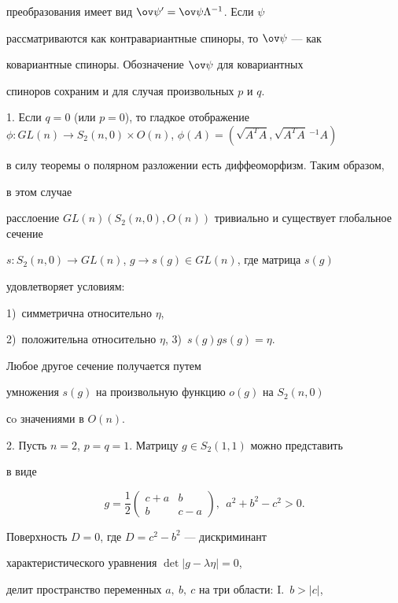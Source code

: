 преобразования имеет вид $\ov \psi'=\ov \psi\Lambda^{-1}$. Если $\psi$ 


рассматриваются как контравариантные спиноры, то $\ov \psi$ --- как 


ковариантные спиноры. Обозначение $\ov \psi$ для ковариантных


спиноров сохраним и для случая произвольных $p$ и $q$.


\smallskip





1. Если $q=0$ (или $p=0$), то гладкое отображение $\phi: GL(n)\to 


S_2(n,0)\times O(n)$, $\phi(A)=(\sqrt{A^TA},\sqrt{A^TA}\,^{-1}A)$


в силу теоремы о полярном разложении есть диффеоморфизм. Таким образом,


в этом случае


расслоение $GL(n)(S_2(n,0),O(n))$ тривиально и существует глобальное сечение


$s: S_2(n,0) \to GL(n)$, $g \to  s(g)\in GL(n)$, где матрица $s(g)$


удовлетворяет условиям:


1)~симметрична относительно $\eta$,


2)~положительна относительно $\eta$, 3)~$s(g)gs(g)=\eta$.


Любое другое сечение получается путем


умножения $s(g)$ на произвольную функцию $o(g)$ на $S_2(n,0)$


сo значениями в $O(n)$.


\smallskip





2. Пусть $n=2$, $p=q=1$. Матрицу $g\in S_2(1,1)$ можно представить


в виде


$$


g=\frac{1}{2}\begin{pmatrix} c+a & b\\


b& c-a\end{pmatrix},\ \ a^2+b^2-c^2>0.


$$


Поверхность $D=0$, где $D=c^2-b^2$ --- дискриминант


характеристического уравнения $\det |g-\lambda\eta|=0$,


делит пространство переменных $a,\ b,\ c$ на три области: I.~$b>|c|$,



